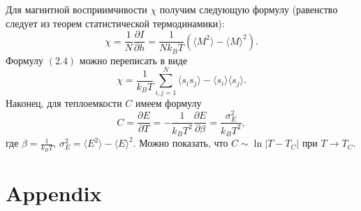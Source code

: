 \documentclass[12pt]{report}
\theoremstyle{definition}
\begin{document}
\noindent Для магнитной восприимчивости $\chi$ получим следующую формулу (равенство следует из теорем статистической термодинамики):
\begin{equation}
    \chi = \frac{1}{N}\frac{\partial I}{\partial h} = \frac{1}{Nk_BT}(\langle M^2 \rangle - \langle M \rangle^2).
\end{equation}
Формулу $(2.4)$ можно переписать в виде
\begin{equation}
    \chi = \frac{1}{k_BT}\sum_{i, j = 1}^N \langle s_is_j \rangle - \langle s_i \rangle \langle s_j \rangle.
\end{equation}
Наконец, для теплоемкости $C$ имеем формулу
\begin{equation}
    C = \frac{\partial E}{\partial T} = -\frac{1}{k_BT^2}\frac{\partial E}{\partial \beta} = \frac{\sigma^2_E}{k_BT^2},
\end{equation}
где $\beta = \frac{1}{k_BT}, \, \sigma_E^2 =  \langle E^2 \rangle - \langle  E \rangle^2$. Можно показать, что $C \sim \ln |T - T_C| \text{ при } T \to T_C$.


\chapter{Appendix}
\end{document}
